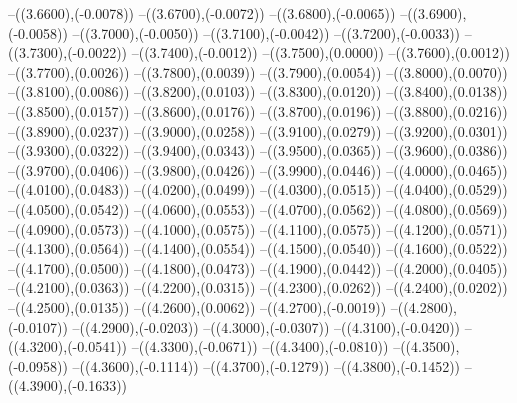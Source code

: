 {	--({\sx*(3.6600)},{\sy*(-0.0078)})
	--({\sx*(3.6700)},{\sy*(-0.0072)})
	--({\sx*(3.6800)},{\sy*(-0.0065)})
	--({\sx*(3.6900)},{\sy*(-0.0058)})
	--({\sx*(3.7000)},{\sy*(-0.0050)})
	--({\sx*(3.7100)},{\sy*(-0.0042)})
	--({\sx*(3.7200)},{\sy*(-0.0033)})
	--({\sx*(3.7300)},{\sy*(-0.0022)})
	--({\sx*(3.7400)},{\sy*(-0.0012)})
	--({\sx*(3.7500)},{\sy*(0.0000)})
	--({\sx*(3.7600)},{\sy*(0.0012)})
	--({\sx*(3.7700)},{\sy*(0.0026)})
	--({\sx*(3.7800)},{\sy*(0.0039)})
	--({\sx*(3.7900)},{\sy*(0.0054)})
	--({\sx*(3.8000)},{\sy*(0.0070)})
	--({\sx*(3.8100)},{\sy*(0.0086)})
	--({\sx*(3.8200)},{\sy*(0.0103)})
	--({\sx*(3.8300)},{\sy*(0.0120)})
	--({\sx*(3.8400)},{\sy*(0.0138)})
	--({\sx*(3.8500)},{\sy*(0.0157)})
	--({\sx*(3.8600)},{\sy*(0.0176)})
	--({\sx*(3.8700)},{\sy*(0.0196)})
	--({\sx*(3.8800)},{\sy*(0.0216)})
	--({\sx*(3.8900)},{\sy*(0.0237)})
	--({\sx*(3.9000)},{\sy*(0.0258)})
	--({\sx*(3.9100)},{\sy*(0.0279)})
	--({\sx*(3.9200)},{\sy*(0.0301)})
	--({\sx*(3.9300)},{\sy*(0.0322)})
	--({\sx*(3.9400)},{\sy*(0.0343)})
	--({\sx*(3.9500)},{\sy*(0.0365)})
	--({\sx*(3.9600)},{\sy*(0.0386)})
	--({\sx*(3.9700)},{\sy*(0.0406)})
	--({\sx*(3.9800)},{\sy*(0.0426)})
	--({\sx*(3.9900)},{\sy*(0.0446)})
	--({\sx*(4.0000)},{\sy*(0.0465)})
	--({\sx*(4.0100)},{\sy*(0.0483)})
	--({\sx*(4.0200)},{\sy*(0.0499)})
	--({\sx*(4.0300)},{\sy*(0.0515)})
	--({\sx*(4.0400)},{\sy*(0.0529)})
	--({\sx*(4.0500)},{\sy*(0.0542)})
	--({\sx*(4.0600)},{\sy*(0.0553)})
	--({\sx*(4.0700)},{\sy*(0.0562)})
	--({\sx*(4.0800)},{\sy*(0.0569)})
	--({\sx*(4.0900)},{\sy*(0.0573)})
	--({\sx*(4.1000)},{\sy*(0.0575)})
	--({\sx*(4.1100)},{\sy*(0.0575)})
	--({\sx*(4.1200)},{\sy*(0.0571)})
	--({\sx*(4.1300)},{\sy*(0.0564)})
	--({\sx*(4.1400)},{\sy*(0.0554)})
	--({\sx*(4.1500)},{\sy*(0.0540)})
	--({\sx*(4.1600)},{\sy*(0.0522)})
	--({\sx*(4.1700)},{\sy*(0.0500)})
	--({\sx*(4.1800)},{\sy*(0.0473)})
	--({\sx*(4.1900)},{\sy*(0.0442)})
	--({\sx*(4.2000)},{\sy*(0.0405)})
	--({\sx*(4.2100)},{\sy*(0.0363)})
	--({\sx*(4.2200)},{\sy*(0.0315)})
	--({\sx*(4.2300)},{\sy*(0.0262)})
	--({\sx*(4.2400)},{\sy*(0.0202)})
	--({\sx*(4.2500)},{\sy*(0.0135)})
	--({\sx*(4.2600)},{\sy*(0.0062)})
	--({\sx*(4.2700)},{\sy*(-0.0019)})
	--({\sx*(4.2800)},{\sy*(-0.0107)})
	--({\sx*(4.2900)},{\sy*(-0.0203)})
	--({\sx*(4.3000)},{\sy*(-0.0307)})
	--({\sx*(4.3100)},{\sy*(-0.0420)})
	--({\sx*(4.3200)},{\sy*(-0.0541)})
	--({\sx*(4.3300)},{\sy*(-0.0671)})
	--({\sx*(4.3400)},{\sy*(-0.0810)})
	--({\sx*(4.3500)},{\sy*(-0.0958)})
	--({\sx*(4.3600)},{\sy*(-0.1114)})
	--({\sx*(4.3700)},{\sy*(-0.1279)})
	--({\sx*(4.3800)},{\sy*(-0.1452)})
	--({\sx*(4.3900)},{\sy*(-0.1633)})
}
